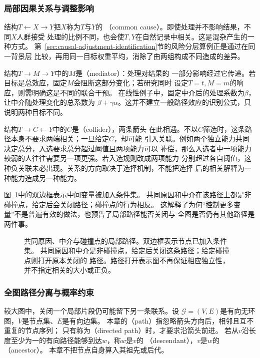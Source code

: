 \subsubsection{局部因果关系与调整影响}
\label{sec:causal-local-path-patterns}

结构\(T\leftarrow X\to Y\)把\(X\)称为\(T\)与\(Y\)的
（common cause）。即使处理并不影响结果，不同\(X\)人群接受
处理的比例不同，也会使\(T,Y\)在自然记录中相关。这是混杂产生的一种方式。
第~\ref{sec:causal-adjustment-identification}节的风险分层算例正是通过在同一背景层
比较，再用同一目标权重平均，消除了由两组构成不同造成的差异。

结构\(T\to M\to Y\)中的\(M\)是（mediator）：处理对结果的
一部分影响经过它传递。若目标是总效应，固定\(M\)会阻断这部分变化；若研究同时
设定\(T=t,M=m\)的响应，则需明确这是不同的联合干预。
在线性例子中，固定中介后的处理系数为\(\beta\)，让中介随处理变化的总系数为
\(\beta+\gamma\alpha\)。这并不建立一般路径效应的识别公式，只说明两种目标不同。

结构\(T\to C\leftarrow Y\)中的\(C\)是（collider），两条箭头
在此相遇。不以\(C\)筛选时，这条路径本身不要求两端相关；一旦给定\(C\)，却可能
引入关联。例如两个独立能力共同决定总分，入选要求总分超过阈值且两项能力可以
补偿，那么入选者中一项能力较弱的人往往需要另一项更强。若入选规则改成两项能力
分别超过各自阈值，这种负关联未必出现。关系的方向取决于选择机制，不能把选择
后的相关解释为一种能力造成另一种能力。

图~\ref{fig:causal-local-path-patterns}中的双边框表示中间变量被加入条件集。
共同原因和中介在该路径上都是非碰撞点，给定后会关闭路径；碰撞点的行为相反。
这解释了为何“控制更多变量”不是普遍有效的做法，也预告了局部路径能否关闭与
全图是否仍有其他路径是两件事。
\begin{figure}[htbp]
  \centering
  
  \caption{共同原因、中介与碰撞点的局部路径。双边框表示节点已加入条件集。
  共同原因和中介是非碰撞点，给定后关闭这条路径；给定碰撞点则打开原本关闭的
  路径。路径打开表示图不再保证相应独立性，并不指定相关的大小或正负。}
  \label{fig:causal-local-path-patterns}
\end{figure}

\subsubsection{全图路径分离与概率约束}
\label{sec:causal-global-path-separation}

较大图中，关闭一个局部片段仍可能留下另一条联系。设
\(\mathcal G=(V,E)\)是有向无环图，\(V\)是节点集、\(E\)是有向边集。
本章的（path）指忽略箭头方向后，相邻且互不重复的节点序列；
只有称为（directed path）时，才要求沿箭头前进。
若从\(v\)沿长度至少为一的有向路径能够到达\(w\)，称\(w\)是\(v\)的
（descendant），\(v\)是\(w\)的（ancestor）。
本章不把节点自身算入其祖先或后代。

